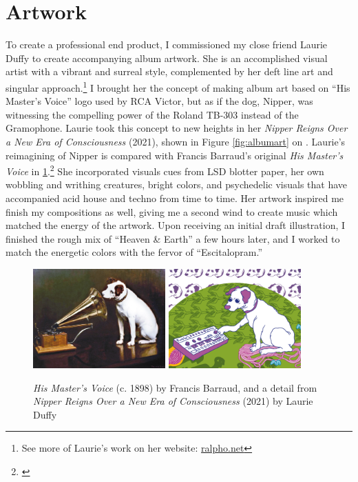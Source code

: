 \documentclass[12pt,twoside]{reedthesis}
\begin{document}
\section{Artwork}

To create a professional end product, I commissioned my close friend Laurie Duffy to create accompanying album artwork. She is an accomplished visual artist with a vibrant and surreal style, complemented by her deft line art and singular approach.\footnote{See more of Laurie's work on her website: \url{ralpho.net}} I brought her the concept of making album art based on ``His Master's Voice'' logo used by RCA Victor, but as if the dog, Nipper, was witnessing the compelling power of the Roland TB-303 instead of the Gramophone. Laurie took this concept to new heights in her \emph{Nipper Reigns Over a New Era of Consciousness} (2021), shown in Figure \ref{fig:albumart} on \pageref{fig:albumart}. Laurie's reimagining of Nipper is compared with Francis Barraud's original \emph{His Master's Voice} in \ref{fig:dogcomparis}.\footnote{\cite{barraudHMV1898}} She incorporated visuals cues from LSD blotter paper, her own wobbling and writhing creatures, bright colors, and psychedelic visuals that have accompanied acid house and techno from time to time. Her artwork inspired me finish my compositions as well, giving me a second wind to create music which matched the energy of the artwork. Upon receiving an initial draft illustration, I finished the rough mix of ``Heaven {\&} Earth'' a few hours later, and I worked to match the energetic colors with the fervor of ``Escitalopram.''

\begin{figure}[htbp]
	\begin{centering}
		\includegraphics[width=2in]{./Images/Original_Nipper}
		\includegraphics[width=2in]{./Images/ALBUM_ART_DETAIL}
		\caption{\emph{His Master's Voice} (c. 1898) by Francis Barraud, and a detail from \emph{Nipper Reigns Over a New Era of Consciousness} (2021) by Laurie Duffy}
		\label{fig:dogcomparis}
	\end{centering}
\end{figure}
\end{document}
